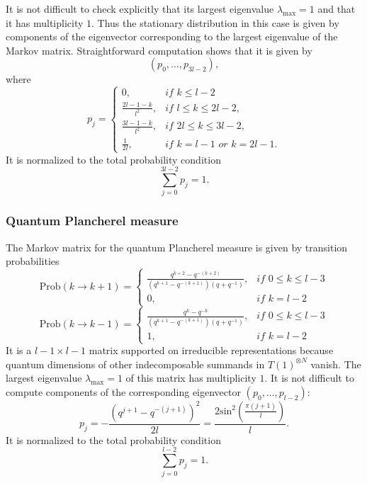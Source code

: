 \documentclass[11pt]{amsart}
\begin{document}
It is not difficult to check explicitly that its largest eigenvalue $\lambda_{\text{max}}=1$ and that it has multiplicity $1$. Thus the stationary distribution in this case is given by components of the eigenvector corresponding to the largest eigenvalue of the Markov matrix. Straightforward computation shows that it is given by 
\begin{equation*}
(p_0,\ldots, p_{3l-2}),
\end{equation*}
where
\begin{equation*}
p_j=\begin{cases}
0,&\textit{if $k\leq l-2$}\\
\frac{2l-1-k}{l^2},&\textit{if $l\leq k\leq 2l-2$,}\\
\frac{3l-1-k}{l^2},&\textit{if $2l\leq k\leq 3l-2$,}\\
\frac{1}{2l},&\textit{if $k=l-1$ or $k=2l-1$.}
\end{cases}
\end{equation*}
It is normalized to the total probability condition
$$
\sum\limits_{j=0}^{3l-2}p_j=1.
$$


\subsubsection{Quantum Plancherel measure}
The Markov matrix for the quantum Plancherel measure is given by transition probabilities
\begin{equation*}
\mathrm{Prob}(k\to k+1)=\begin{cases}
\frac{q^{k+2}-q^{-(k+2)}}{(q^{k+1}-q^{-(k+1)})(q+q^{-1})},&\textit{if $0\leq k \leq l-3$}\\
0,&\textit{if $k=l-2$}
\end{cases}
\end{equation*}
\begin{equation*}
\mathrm{Prob}(k\to k-1)=\begin{cases}
\frac{q^{k}-q^{-k}}{(q^{k+1}-q^{-(k+1)})(q+q^{-1})},&\textit{if $0\leq k \leq l-3$}\\
1,&\textit{if $k=l-2$}
\end{cases}
\end{equation*}
It is a $l-1 \times l-1$ matrix supported on irreducible representations because quantum dimensions of other indecomposable summands in $T(1)^{\otimes N}$ vanish. The largest eigenvalue $\lambda_{\text{max}}=1$ of this matrix has multiplicity $1$. It is not difficult to compute components of the corresponding eigenvector $(p_0,\ldots, p_{l-2})$:
\begin{equation*}
p_j=-\frac{(q^{j+1}-q^{-(j+1)})^2}{2l}=\frac{2\mathrm{sin}^2\left(\frac{\pi (j+1)}{l} \right)}{l}.
\end{equation*}
It is normalized to the total probability condition
$$
\sum\limits_{j=0}^{l-2}p_j=1.
$$
\end{document}
